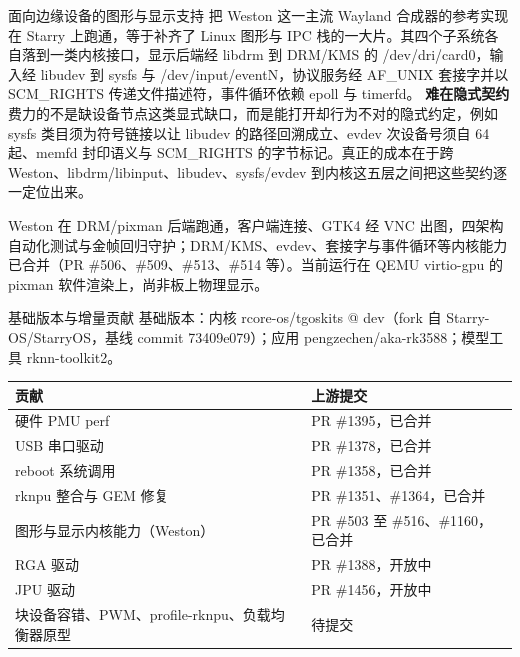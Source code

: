 \documentclass[aspectratio=169,fontset=mac]{ctexbeamer}
\newcommand{\hdr}[1]{\textsf{\bfseries\color{ink}#1}}
\newcommand{\headrow}{\rowcolor{tinthdr}}
\newcommand{\keyline}[1]{\par\vskip3pt\noindent\colorbox{tintbox}{\parbox{0.91\textwidth}{\color{ink}#1}}\par}
\begin{document}
\begin{frame}{面向边缘设备的图形与显示支持}
\small
把 Weston 这一主流 Wayland 合成器的参考实现在 Starry 上跑通，等于补齐了 Linux 图形与 IPC 栈的一大片。其四个子系统各自落到一类内核接口，显示后端经 libdrm 到 DRM/KMS 的 /dev/dri/card0，输入经 libudev 到 sysfs 与 /dev/input/eventN，协议服务经 AF\_UNIX 套接字并以 SCM\_RIGHTS 传递文件描述符，事件循环依赖 epoll 与 timerfd。
\vskip4pt
\textbf{难在隐式契约}\quad 费力的不是缺设备节点这类显式缺口，而是能打开却行为不对的隐式约定，例如 sysfs 类目须为符号链接以让 libudev 的路径回溯成立、evdev 次设备号须自 64 起、memfd 封印语义与 SCM\_RIGHTS 的字节标记。真正的成本在于跨 Weston、libdrm/libinput、libudev、sysfs/evdev 到内核这五层之间把这些契约逐一定位出来。
\keyline{Weston 在 DRM/pixman 后端跑通，客户端连接、GTK4 经 VNC 出图，四架构自动化测试与金帧回归守护；DRM/KMS、evdev、套接字与事件循环等内核能力已合并（PR \#506、\#509、\#513、\#514 等）。当前运行在 QEMU virtio-gpu 的 pixman 软件渲染上，尚非板上物理显示。}
\end{frame}

\begin{frame}{基础版本与增量贡献}
\footnotesize
基础版本：内核 rcore-os/tgoskits @ dev（fork 自 Starry-OS/StarryOS，基线 commit 73409e079）；应用 pengzechen/aka-rk3588；模型工具 rknn-toolkit2。
\vskip4pt
\begin{tabular}{@{}p{}p{}@{}}
\toprule
\headrow \hdr{贡献} & \hdr{上游提交}\\
\midrule
硬件 PMU perf & PR \#1395，已合并\\
USB 串口驱动 & PR \#1378，已合并\\
reboot 系统调用 & PR \#1358，已合并\\
rknpu 整合与 GEM 修复 & PR \#1351、\#1364，已合并\\
图形与显示内核能力（Weston）& PR \#503 至 \#516、\#1160，已合并\\
RGA 驱动 & PR \#1388，开放中\\
JPU 驱动 & PR \#1456，开放中\\
块设备容错、PWM、profile-rknpu、负载均衡器原型 & 待提交\\
\bottomrule
\end{tabular}
\end{frame}
\end{document}
